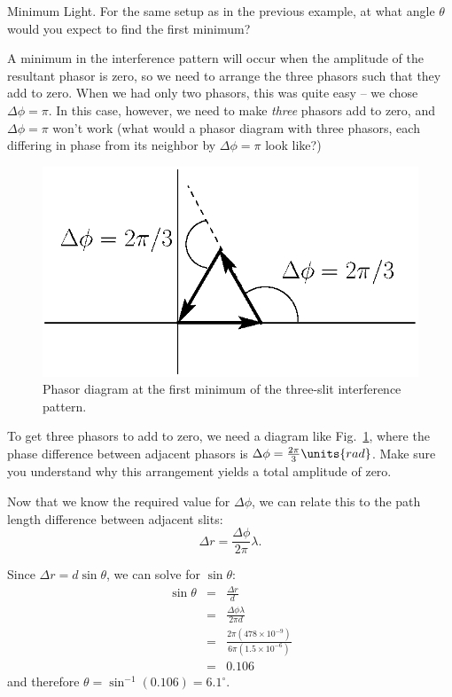\begin{exampleb}{Minimum Light.} 
For the same setup as in the previous example, 
at what angle $\theta$ would you expect to find the first minimum?
\begin{solution}
A minimum in the interference pattern will occur when the amplitude of
the resultant phasor is zero, so we need to arrange the three phasors
such that they add to zero. When we had only two phasors, this was
quite easy -- we chose $\Delta \phi = \pi$. In this case, however, we
need to make {\em three} phasors add to zero, and $\Delta \phi = \pi$
won't work (what would a phasor diagram with three phasors, each
differing in phase from its neighbor by $\Delta \phi = \pi$ look like?)

\begin{figure}\begin{center}
 \includegraphics[width=2.4truein]{phasors/phasor23} 
\caption{\label{fig:phasor23}Phasor diagram at the first minimum of the three-slit
interference pattern.}
\end{center}
\end{figure}
 

To get three phasors to add to zero, we need a diagram like
Fig.~\ref{fig:phasor23}, where the phase difference between adjacent
phasors is $\Delta\phi = \frac{2\pi}{3}\units{rad}$. Make sure you
understand why this arrangement yields a total amplitude of zero.

Now that we know the required value for $\Delta\phi$, we can relate
this to the path length difference between adjacent slits:
\begin{equation}
\Delta r = \frac{\Delta\phi}{2\pi} \lambda.
\end{equation} 

Since $\Delta r = d\sin{\theta}$, we can solve for $\sin{\theta}$:
\begin{eqnarray*}
\sin{\theta} & = & \frac{\Delta r}{d} \\
             & = & \frac{\Delta\phi\lambda}{2\pi d} \\
             & = & \frac{2\pi(478 \times 10^{-9})}{6 \pi (1.5 \times 10^{-6})}\\
             & = & 0.106
\end{eqnarray*}
and therefore $\theta = \sin^{-1}{(0.106)} = 6.1^\circ$.



\end{solution}
\end{exampleb}
